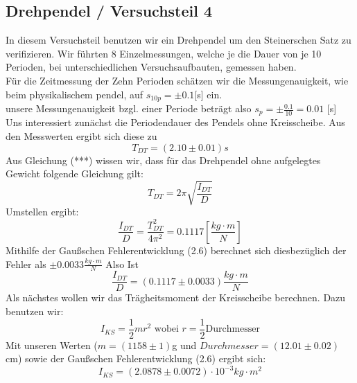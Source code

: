 \documentclass[11pt,a4paper]{article}
\begin{document}
	\subsection{Drehpendel / Versuchsteil 4}
	In diesem Versuchsteil benutzen wir ein Drehpendel um den Steinerschen Satz zu verifizieren.
	Wir führten 8 Einzelmessungen, welche je die  Dauer von je 10 Perioden, bei unterschiedlichen Versuchsaufbauten, gemessen haben.\\
	Für die Zeitmessung der Zehn Perioden schätzen wir die Messungenauigkeit, wie beim physikalischem pendel, auf $s_{10p}=\pm 0.1$[s] ein.\\
	unsere Messungenauigkeit bzgl. einer Periode beträgt also $s_p=\pm \frac{0.1}{10} =0.01$ [s]
	\\
	Uns interessiert zunächst die Periodendauer des Pendels ohne Kreisscheibe. Aus den Messwerten
	ergibt sich diese zu $$T_{DT}=(2.10\pm 0.01)s$$
	Aus Gleichung (***) wissen wir, dass für das Drehpendel ohne aufgelegtes Gewicht folgende Gleichung gilt:
	\begin{equation}
	T_{DT}=2 \pi \sqrt{\frac{I_{DT}}{D}}
	\end{equation}
	Umstellen ergibt:
	\begin{equation}
	\frac{I_{DT}}{D} = \frac{T_{DT}^2}{4 \pi^2}=0.1117[\frac{kg\cdot m}{N}]
	\end{equation}
	Mithilfe der Gaußschen Fehlerentwicklung (2.6) berechnet sich diesbezüglich der Fehler als $\pm 0.0033
	\frac{kg \cdot m}{N}$
	Also Ist $$\frac{I_{DT}}{D} =(0.1117 \pm 0.0033)\frac{kg\cdot m}{N}$$
	Als nächstes wollen wir das Trägheitsmoment der Kreisscheibe berechnen. Dazu benutzen wir:
	\begin{equation}
	I_{KS}=\frac{1}{2}m r^2 \text{  wobei  } r=\frac{1}{2} \text{Durchmesser}
	\end{equation}
	Mit unseren Werten ($m=(1158\pm 1)$g und $Durchmesser=(12.01 \pm 0.02)$cm) sowie der Gaußschen
	Fehlerentwicklung (2.6) ergibt sich:
	\begin{equation}
	I_{KS}=(2.0878 \pm 0.0072)\cdot 10^{-3} kg \cdot m^2
	\end{equation}
	
	
	
	
	
	
	
\end{document}
